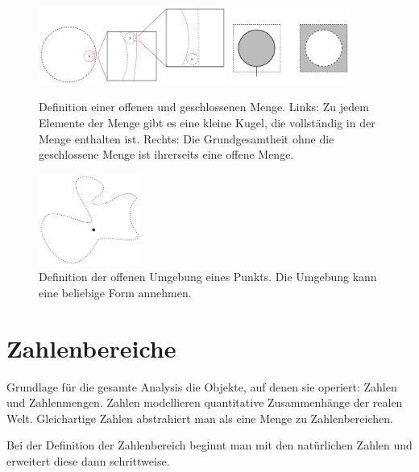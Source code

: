 \begin{figure}
    \centering
    \includegraphics[width=0.55\textwidth]{./svg/open-set}
    \includegraphics[width=0.35\textwidth]{./svg/closed-set}
    \caption[Offene und geschlossene Menge]{Definition einer offenen und geschlossenen Menge. Links: Zu jedem Elemente der Menge gibt es eine kleine Kugel, die vollständig in der Menge enthalten ist. Rechts: Die Grundgesamtheit ohne die geschlossene Menge ist ihrerseits eine offene Menge.}
    \label{fig:OpenClosedSet}
\end{figure}

\begin{figure}
    \centering
    \includegraphics[width=0.3\textwidth]{./svg/open-neighborhood}
    \caption[Offene Umgebung]{Definition der offenen Umgebung eines Punkts. Die Umgebung kann eine beliebige Form annehmen.}
    \label{fig:OpenNeighborhood}
\end{figure}

\section{Zahlenbereiche}

Grundlage für die gesamte Analysis die Objekte, auf denen sie operiert: Zahlen und Zahlenmengen. Zahlen modellieren quantitative Zusammenhänge der realen Welt. Gleichartige Zahlen abstrahiert man als eine Menge zu Zahlenbereichen.

Bei der Definition der Zahlenbereich beginnt man mit den natürlichen Zahlen und erweitert diese dann schrittweise.

